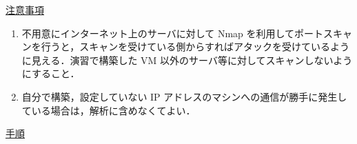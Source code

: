 \vspace{1cm}

{\LARGE \uline{注意事項}}

\begin{enumerate}[label=・]
    \item 不用意にインターネット上のサーバに対して Nmap を利用してポートスキャンを行うと，スキャンを受けている側からすればアタックを受けているように見える．演習で構築した VM 以外のサーバ等に対してスキャンしないようにすること．
    \item 自分で構築，設定していない IP アドレスのマシンへの通信が勝手に発生している場合は，解析に含めなくてよい．
\end{enumerate}

\vspace{1cm}

{\LARGE \uline{手順}} 

